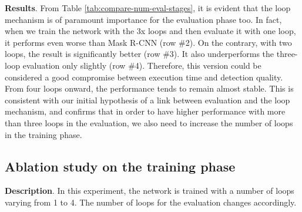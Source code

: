 \documentclass[runningheads, orivec]{llncs}
\begin{document}
\noindent\textbf{Results}.
From Table \ref{tab:compare-num-eval-stages}, it is evident that the loop mechanism is of paramount importance for the evaluation phase too.
In fact, when we train the network with the 3x loops and then evaluate it with one loop, it performs even worse than Mask R-CNN (row \#2).
On the contrary, with two loops, the result is significantly better (row \#3).
It also underperforms the three-loop evaluation only slightly (row \#4). 
Therefore, this version could be considered a good compromise between execution time and detection quality.
From four loops onward, the performance tends to remain almost stable.
This is consistent with our initial hypothesis of a link between evaluation and the loop mechanism, and confirms that in order to have higher performance with more than three loops in the evaluation, we also need to increase the number of loops in the training phase. \subsection{Ablation study on the training phase}

\noindent\textbf{Description}.
In this experiment, the network is trained with a number of loops varying from 1 to 4.
The number of loops for the evaluation changes accordingly.
\end{document}
